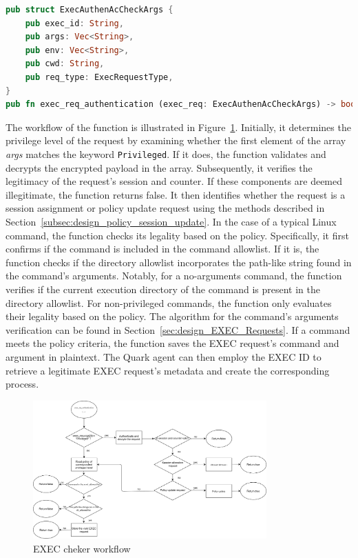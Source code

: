\begin{lstlisting}[language=rust, caption= API of EXEC checker, label={lst:exec_Cheker}]
pub struct ExecAuthenAcCheckArgs {
    pub exec_id: String,
    pub args: Vec<String>,
    pub env: Vec<String>,
    pub cwd: String,
    pub req_type: ExecRequestType,
}
pub fn exec_req_authentication (exec_req: ExecAuthenAcCheckArgs) -> bool
\end{lstlisting}

The workflow of the function is illustrated in Figure~\ref{fig:exec_req_authentication_flow_chart}. Initially, it determines the privilege level of the request by examining whether the first element of the array \emph{args} matches the keyword \texttt{Privileged}. If it does, the function 
validates and decrypts the encrypted payload in the array. Subsequently, it verifies the legitimacy of the request's session and counter. If these components are deemed illegitimate, the function returns false. It then identifies whether the request is a session assignment or policy update request 
using the methods described in Section~\ref{subsec:design_policy_session_update}. In the case of a typical Linux command, the function checks its legality based on the policy. Specifically, it first confirms if the command is included in the command allowlist. If it is, the function checks if the 
directory allowlist incorporates the path-like string found in the command's arguments. Notably, for a no-arguments command, the function verifies if the current execution directory of the command is present in the directory allowlist. For non-privileged commands, the function only evaluates 
their legality based on the policy. The algorithm for the command's arguments verification can be found in Section~\ref{sec:design_EXEC_Requests}. If a command meets the policy criteria, the function saves the EXEC request's command and argument in plaintext. The Quark agent can then employ 
the EXEC ID to retrieve a legitimate EXEC request's metadata and create the corresponding process.

\begin{figure}[!htb]
    \centering
    \includegraphics[width=0.8\textwidth]{images/exec_req_authentication_flow_chart.png}
    \caption[EXEC cheker workflow]{EXEC cheker workflow}
    \label{fig:exec_req_authentication_flow_chart}
\end{figure}

